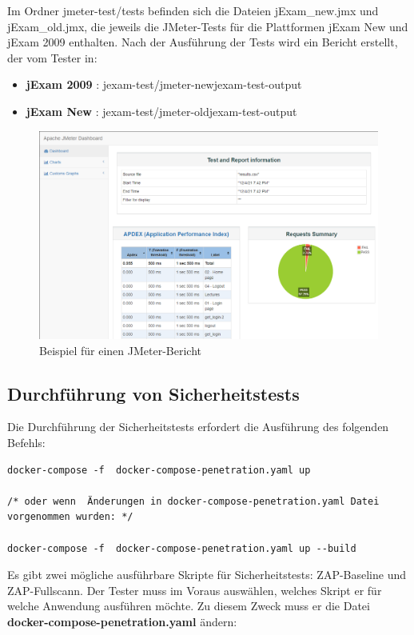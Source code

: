 Im Ordner jmeter-test/tests befinden sich die
Dateien jExam\_new.jmx und jExam\_old.jmx, die
jeweils die JMeter-Tests für die Plattformen
jExam New und jExam 2009 enthalten. Nach der
Ausführung der Tests wird ein Bericht erstellt, der
vom Tester in:
\begin{itemize}
    \item[] \textbf{jExam 2009} : jexam-test/jmeter-newjexam-test-output
    \item[] \textbf{jExam New} : jexam-test/jmeter-oldjexam-test-output
\end{itemize}

\begin{figure}[H]
    \centering
    \includegraphics[scale=0.4]{images/jmeter-report}
    \caption{Beispiel für einen JMeter-Bericht} \label{fig:jmeter-report}
\end{figure}

\subsection{Durchführung von Sicherheitstests}

Die Durchführung der Sicherheitstests erfordert die
Ausführung des folgenden Befehls:

\begin{lstlisting}[caption={Befehl zur Durchführung der Sicherheitstests}]
docker-compose -f  docker-compose-penetration.yaml up

/* oder wenn  Änderungen in docker-compose-penetration.yaml Datei vorgenommen wurden: */

docker-compose -f  docker-compose-penetration.yaml up --build
\end{lstlisting}

Es gibt zwei mögliche ausführbare Skripte für
Sicherheitstests: ZAP-Baseline und ZAP-Fullscann.
Der Tester muss im Voraus auswählen, welches Skript
er für welche Anwendung ausführen möchte. Zu diesem
Zweck muss er die Datei
\textbf{docker-compose-penetration.yaml} ändern:

